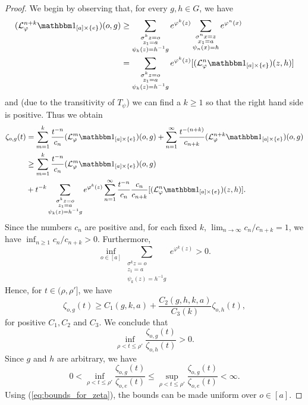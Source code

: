 \documentclass[11pt,letterpaper]{amsart}
\theoremstyle{definition}
\numberwithin{equation}{section}
\numberwithin{theorem}{section}
\def\vp{\varphi}
\begin{document}
\begin{proof}
We begin by observing that, for every $g,h \in G$, we have
\begin{align*}
(\mathcal L_{\vp}^{n+k}\mathbbm 1_{[a] \times \{e\}})(o,g)
&\ge
\sum_{\substack{\sigma^kz=o \\z_1=a\\ \psi_k(z)=h^{-1}g}} e^{\vp^k(z)}
\sum_{\substack{\sigma^nx=z \\x_1=a\\ \psi_n(x)= h}} e^{\vp^n(x)}
\\
&=
\sum_{\substack{\sigma^kz=o \\z_1=a \\ \psi_k(z)=h^{-1}g}} e^{\vp^k(z)}
[(\mathcal L_\vp^n\mathbbm 1_{[a] \times \{e\}})(z,h)]
\end{align*}
and (due to the transitivity of $T_\psi$) we can find a $k \ge 1$ so that the right
hand side is positive. Thus we obtain
\begin{align*}
\zeta_{o,g}(t) 
&= 
\sum_{m=1}^k \frac{t^{-n}}{c_n} (\mathcal L_\vp^m \mathbbm 1_{[a] \times
\{e\}})(o,g)
+ \sum_{n=1}^\infty \frac{t^{-(n+k)}}{c_{n+k}} 
(\mathcal L_{\vp}^{n+k}\mathbbm 1_{[a] \times \{e\}})(o,g)
\\
&\ge 
\sum_{m=1}^k \frac{t^{-n}}{c_n} (\mathcal L_\vp^m \mathbbm 1_{[a] \times
\{e\}})(o,g)
\\
&+
t^{-k}\sum_{\substack{\sigma^kz=o \\z_1=a\\ \psi_k(z)=h^{-1}g}} e^{\vp^k(z)}
\sum_{n=1}^\infty \frac{t^{-n}}{c_n} \frac{c_n}{c_{n+k}}
[(\mathcal L_\vp^n\mathbbm 1_{[a] \times \{e\}})(z,h)].
\end{align*}
Since the numbers $c_n$ are positive and, for each fixed $k$, 
$\lim_{n \to \infty} c_n/c_{n+k}=1$, we have
$\inf_{n \ge 1} c_n/c_{n+k} >0$.
Furthermore,
\[
\inf_{o \in [a]} \sum_{\substack{\sigma^kz=o \\z_1=a\\ \psi_k(z) = h^{-1}g}} e^{\vp^k(z)} >0.
\]
Hence, for $t \in (\rho,\rho']$, we have
\[
\zeta_{o,g}(t) \ge C_1(g,k,a) + \frac{C_2(g,h,k,a)}{C_3(k)}\zeta_{o,h}(t),
\]
for positive $C_1,C_2$ and $C_3$.
We conclude that
\[
\inf_{\rho <t\le \rho'} \frac{\zeta_{o,g}(t)}{\zeta_{o,h}(t)} >0.
\]
Since $g$ and $h$ are arbitrary, we have 
\[
0 <  \inf_{\rho < t \le \rho'} \frac{\zeta_{o,g}(t)}{\zeta_{o,e}(t)} 
\le  \sup_{\rho < t \le \rho'} \frac{\zeta_{o,g}(t)}{\zeta_{o,e}(t)} < \infty.
\]
Using (\ref{eq:bounds_for_zeta}), the bounds can be made uniform over $o \in [a]$.
\end{proof}
\end{document}
